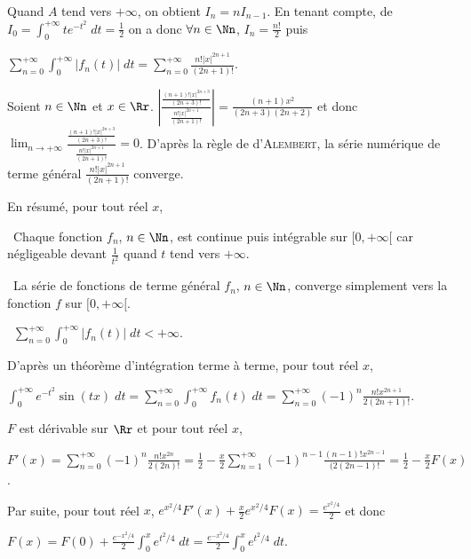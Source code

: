 {{Quand $A$ tend vers $+\infty$, on obtient $I_{n}=nI_{n-1}$. En tenant compte, de $I_0=\int_{0}^{+\infty}te^{-t^2}\;dt=\frac{1}{2}$ on a donc $\forall n\in\Nn$, $I_n=\frac{n!}{2}$ puis

\begin{center}
$\sum_{n=0}^{+\infty}\int_{0}^{+\infty}|f_n(t)|\;dt=\sum_{n=0}^{+\infty}\frac{n!|x|^{2n+1}}{(2n+1)!}$.
\end{center}

Soient $n\in\Nn$ et $x\in\Rr$. $\left|\frac{\frac{(n+1)!|x|^{2n+3}}{(2n+3)!}}{\frac{n!|x|^{2n+1}}{(2n+1)!}}\right|=\frac{(n+1)x^2}{(2n+3)(2n+2)}$ et donc $\lim_{n \rightarrow +\infty}\frac{\frac{(n+1)!|x|^{2n+3}}{(2n+3)!}}{\frac{n!|x|^{2n+1}}{(2n+1)!}}=0$. D'après la règle de d'\textsc{Alembert}, la série numérique de terme général $\frac{n!|x|^{2n+1}}{(2n+1)!}$ converge.

En résumé, pour tout réel $x$,

\textbullet~Chaque fonction $f_n$, $n\in\Nn$, est continue puis intégrable sur $[0,+\infty[$ car négligeable devant $\frac{1}{t^2}$ quand $t$ tend vers $+\infty$.

\textbullet~La série de fonctions de terme général $f_n$, $n\in\Nn$, converge simplement vers la fonction $f$ sur $[0,+\infty[$.

\textbullet~$\sum_{n=0}^{+\infty}\int_{0}^{+\infty}|f_n(t)|\;dt<+\infty$.

D'après un théorème d'intégration terme à terme, pour tout réel $x$,

\begin{center}
$\int_{0}^{+\infty}e^{-t^2}\sin(tx)\;dt=\sum_{n=0}^{+\infty}\int_{0}^{+\infty}f_n(t)\;dt=\sum_{n=0}^{+\infty}(-1)^n\frac{n!x^{2n+1}}{2(2n+1)!}$.
\end{center}

\begin{center}
\end{center}

$F$ est dérivable sur $\Rr$ et pour tout réel $x$,

\begin{center}
$F'(x)=\sum_{n=0}^{+\infty}(-1)^n\frac{n!x^{2n}}{2(2n)!}=\frac{1}{2}-\frac{x}{2}\sum_{n=1}^{+\infty}(-1)^{n-1}\frac{(n-1)!x^{2n-1}}{(2(2n-1)!}=\frac{1}{2}-\frac{x}{2}F(x)$.
\end{center}

Par suite, pour tout réel $x$, $e^{x^2/4}F'(x) +\frac{x}{2}e^{x^2/4}F(x)=\frac{e^{x^2/4}}{2}$ et donc

\begin{center}
$F(x)=F(0)+\frac{e^{-x^2/4}}{2}\int_{0}^{x}e^{t^2/4}\;dt =\frac{e^{-x^2/4}}{2}\int_{0}^{x}e^{t^2/4}\;dt$.
\end{center}

\begin{center}
\end{center}
}
}

